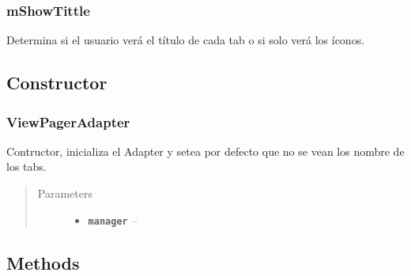 \documentclass[letterpaper,10pt,english]{sphinxmanual}
\begin{document}
\subsubsection{mShowTittle}
\label{Adapter/ViewPagerAdapter:mshowtittle}

\begin{fulllineitems}
\label{Adapter/ViewPagerAdapter:com.fiuba.tallerii.jobify.ViewPagerAdapter.mShowTittle}
Determina si el usuario verá el título de cada tab o si solo verá los íconos.

\end{fulllineitems}



\subsection{Constructor}
\label{Adapter/ViewPagerAdapter:constructor}

\subsubsection{ViewPagerAdapter}
\label{Adapter/ViewPagerAdapter:id1}

\begin{fulllineitems}
\label{Adapter/ViewPagerAdapter:com.fiuba.tallerii.jobify.ViewPagerAdapter.ViewPagerAdapter(FragmentManager)}
Contructor, inicializa el Adapter y setea por defecto que no se vean los nombre de los tabs.
\begin{quote}\begin{description}
\item[{Parameters}] \leavevmode\begin{itemize}
\item {} 
\textbf{\texttt{manager}} -- 

\end{itemize}

\end{description}\end{quote}

\end{fulllineitems}



\subsection{Methods}
\label{Adapter/ViewPagerAdapter:methods}
\end{document}
